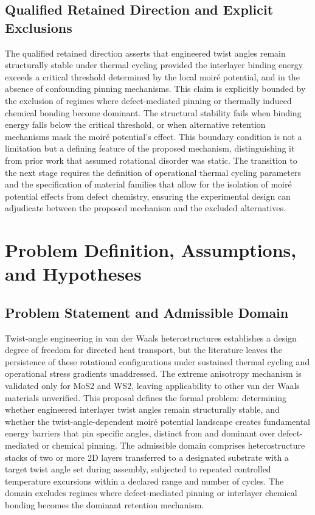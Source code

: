 \documentclass[conference]{IEEEtran}
\begin{document}
\subsection{Qualified Retained Direction and Explicit Exclusions}
The qualified retained direction asserts that engineered twist angles remain structurally stable under thermal cycling provided the interlayer binding energy exceeds a critical threshold determined by the local moiré potential, and in the absence of confounding pinning mechanisms. This claim is explicitly bounded by the exclusion of regimes where defect-mediated pinning or thermally induced chemical bonding become dominant. The structural stability fails when binding energy falls below the critical threshold, or when alternative retention mechanisms mask the moiré potential's effect. This boundary condition is not a limitation but a defining feature of the proposed mechanism, distinguishing it from prior work that assumed rotational disorder was static. The transition to the next stage requires the definition of operational thermal cycling parameters and the specification of material families that allow for the isolation of moiré potential effects from defect chemistry, ensuring the experimental design can adjudicate between the proposed mechanism and the excluded alternatives.

\section{Problem Definition, Assumptions, and Hypotheses}
\subsection{Problem Statement and Admissible Domain}
Twist-angle engineering in van der Waals heterostructures establishes a design degree of freedom for directed heat transport, but the literature leaves the persistence of these rotational configurations under sustained thermal cycling and operational stress gradients unaddressed. The extreme anisotropy mechanism is validated only for MoS2 and WS2, leaving applicability to other van der Waals materials unverified. This proposal defines the formal problem: determining whether engineered interlayer twist angles remain structurally stable, and whether the twist-angle-dependent moiré potential landscape creates fundamental energy barriers that pin specific angles, distinct from and dominant over defect-mediated or chemical pinning. The admissible domain comprises heterostructure stacks of two or more 2D layers transferred to a designated substrate with a target twist angle set during assembly, subjected to repeated controlled temperature excursions within a declared range and number of cycles. The domain excludes regimes where defect-mediated pinning or interlayer chemical bonding becomes the dominant retention mechanism.~\cite{cite_26ecaf73d88dfe33}
\end{document}
